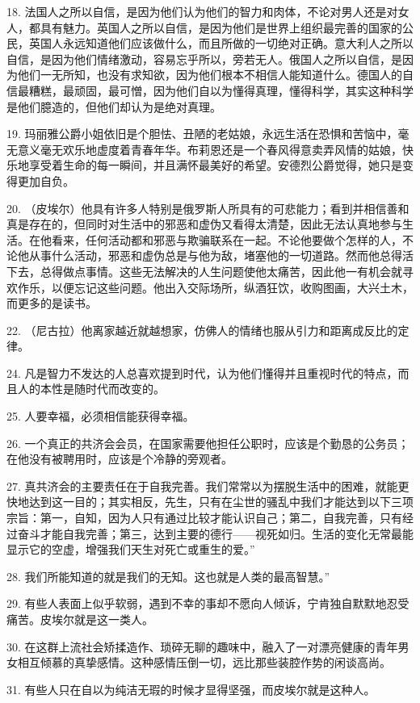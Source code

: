 18. 法国人之所以自信，是因为他们认为他们的智力和肉体，不论对男人还是对女人，都具有魅力。英国人之所以自信，是因为他们是世界上组织最完善的国家的公民，英国人永远知道他们应该做什么，而且所做的一切绝对正确。意大利人之所以自信，是因为他们情绪激动，容易忘乎所以，旁若无人。俄国人之所以自信，是因为他们一无所知，也没有求知欲，因为他们根本不相信人能知道什么。德国人的自信最糟糕，最顽固，最可憎，因为他们自以为懂得真理，懂得科学，其实这种科学是他们臆造的，但他们却认为是绝对真理。

19. 玛丽雅公爵小姐依旧是个胆怯、丑陋的老姑娘，永远生活在恐惧和苦恼中，毫无意义毫无欢乐地虚度着青春年华。布莉恩还是一个春风得意卖弄风情的姑娘，快乐地享受着生命的每一瞬间，并且满怀最美好的希望。安德烈公爵觉得，她只是变得更加自负。

20. （皮埃尔）他具有许多人特别是俄罗斯人所具有的可悲能力；看到并相信善和真是存在的，但同时对生活中的邪恶和虚伪又看得太清楚，因此无法认真地参与生活。在他看来，任何活动都和邪恶与欺骗联系在一起。不论他要做个怎样的人，不论他从事什么活动，邪恶和虚伪总是与他为敌，堵塞他的一切道路。然而他总得活下去，总得做点事情。这些无法解决的人生问题使他太痛苦，因此他一有机会就寻欢作乐，以便忘记这些问题。他出入交际场所，纵酒狂饮，收购图画，大兴土木，而更多的是读书。

22. （尼古拉）他离家越近就越想家，仿佛人的情绪也服从引力和距离成反比的定律。

24. 凡是智力不发达的人总喜欢提到时代，认为他们懂得并且重视时代的特点，而且人的本性是随时代而改变的。

25. 人要幸福，必须相信能获得幸福。

26. 一个真正的共济会会员，在国家需要他担任公职时，应该是个勤恳的公务员；在他没有被聘用时，应该是个冷静的旁观者。

27. 真共济会的主要责任在于自我完善。我们常常以为摆脱生活中的困难，就能更快地达到这一目的；其实相反，先生，只有在尘世的骚乱中我们才能达到以下三项宗旨：第一，自知，因为人只有通过比较才能认识自己；第二，自我完善，只有经过奋斗才能自我完善；第三，达到主要的德行——视死如归。生活的变化无常最能显示它的空虚，增强我们天生对死亡或重生的爱。”

28. 我们所能知道的就是我们的无知。这也就是人类的最高智慧。”

29. 有些人表面上似乎软弱，遇到不幸的事却不愿向人倾诉，宁肯独自默默地忍受痛苦。皮埃尔就是这一类人。

30. 在这群上流社会矫揉造作、琐碎无聊的趣味中，融入了一对漂亮健康的青年男女相互倾慕的真挚感情。这种感情压倒一切，远比那些装腔作势的闲谈高尚。

31. 有些人只在自以为纯洁无瑕的时候才显得坚强，而皮埃尔就是这种人。

